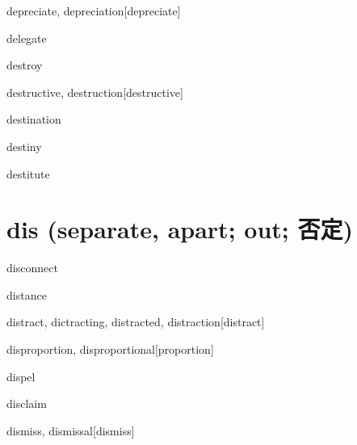 \begin{RefWord}{depreciate, depreciation}[depreciate]
\end{RefWord}

\begin{RefWord}{delegate}
\end{RefWord}

\begin{RefWord}{destroy}
\end{RefWord}

\begin{RefWord}{destructive, destruction}[destructive]
\end{RefWord}

\begin{RefWord}{destination}
\end{RefWord}

\begin{RefWord}{destiny}
\end{RefWord}

\begin{RefWord}{destitute}
\end{RefWord}

\section{dis (separate, apart; out; 否定)}

\begin{RefWord}{disconnect}
\end{RefWord}

\begin{RefWord}{distance}
\end{RefWord}

\begin{RefWord}{distract, dictracting, distracted, distraction}[distract]
\end{RefWord}

\begin{RefWord}{disproportion, disproportional}[proportion]
\end{RefWord}

\begin{RefWord}{dispel}
\end{RefWord}

\begin{RefWord}{disclaim}
\end{RefWord}

\begin{RefWord}{dismiss, dismissal}[dismiss]
\end{RefWord}

